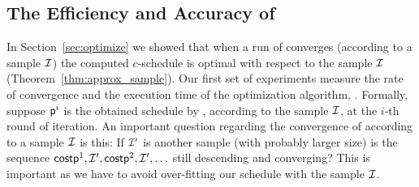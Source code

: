  
\begin{table}[ht]
\centering
{}
\caption{The datasets and corresponding statistics.}\label{table:datasets}
\end{table}







\subsection{The Efficiency and Accuracy of \algonameapx}
In Section~\ref{sec:optimize}  we showed that when a run of \algonameapx converges
(according to a sample $\mathcal{I}$) the computed $c$-schedule is optimal with
respect to the sample $\mathcal{I}$ (Theorem~\ref{thm:approx_sample}). Our first set
of experiments measure the rate of convergence and the execution time of the
optimization algorithm, \algonameapx. Formally, 
suppose $\mathsf{p}^i$ is the obtained schedule by \algonameapx, according to the
sample $\mathcal{I}$, at the $i$-th round of iteration. An important question
regarding the  convergence of \algonameapx according to a sample $\mathcal{I}$ is this: If $\mathcal{I}'$ is another sample (with probably larger size) is the sequence $\mathsf{cost}{\mathsf{p}^1,\mathcal{I}'},\mathsf{cost}{\mathsf{p}^2,\mathcal{I}'},\ldots$ still descending and converging? This is important as we have to  avoid over-fitting our schedule with the sample $\mathcal{I}$.


